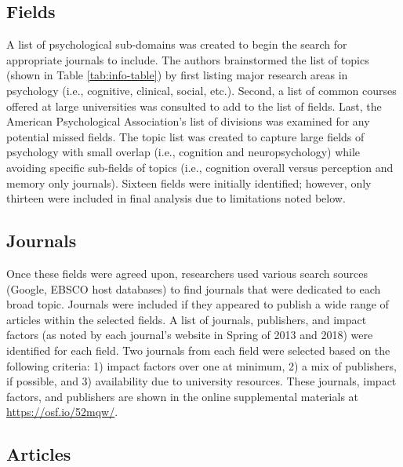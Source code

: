 \documentclass[english,man]{apa6}
\theoremstyle{definition}
\theoremstyle{definition}
\theoremstyle{definition}
\theoremstyle{remark}
\begin{document}
\subsection{Fields}\label{fields}

A list of psychological sub-domains was created to begin the search for
appropriate journals to include. The authors brainstormed the list of
topics (shown in Table \ref{tab:info-table}) by first listing major
research areas in psychology (i.e., cognitive, clinical, social, etc.).
Second, a list of common courses offered at large universities was
consulted to add to the list of fields. Last, the American Psychological
Association's list of divisions was examined for any potential missed
fields. The topic list was created to capture large fields of psychology
with small overlap (i.e., cognition and neuropsychology) while avoiding
specific sub-fields of topics (i.e., cognition overall versus perception
and memory only journals). Sixteen fields were initially identified;
however, only thirteen were included in final analysis due to
limitations noted below.

\subsection{Journals}\label{journals}

Once these fields were agreed upon, researchers used various search
sources (Google, EBSCO host databases) to find journals that were
dedicated to each broad topic. Journals were included if they appeared
to publish a wide range of articles within the selected fields. A list
of journals, publishers, and impact factors (as noted by each journal's
website in Spring of 2013 and 2018) were identified for each field. Two
journals from each field were selected based on the following criteria:
1) impact factors over one at minimum, 2) a mix of publishers, if
possible, and 3) availability due to university resources. These
journals, impact factors, and publishers are shown in the online
supplemental materials at \url{https://osf.io/52mqw/}.

\subsection{Articles}\label{articles}
\end{document}
